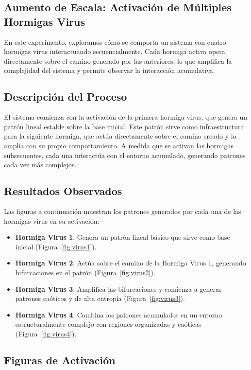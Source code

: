 \documentclass[11pt,letterpaper]{article}
\begin{document}
\begin{multicols}{2}
\section{Aumento de Escala: Activación de Múltiples Hormigas Virus}

En este experimento, exploramos cómo se comporta un sistema con cuatro hormigas virus interactuando secuencialmente. Cada hormiga activa opera directamente sobre el camino generado por las anteriores, lo que amplifica la complejidad del sistema y permite observar la interacción acumulativa.

\subsection{Descripción del Proceso}
El sistema comienza con la activación de la primera hormiga virus, que genera un patrón lineal estable sobre la base inicial. Este patrón sirve como infraestructura para la siguiente hormiga, que actúa directamente sobre el camino creado y lo amplía con su propio comportamiento. A medida que se activan las hormigas subsecuentes, cada una interactúa con el entorno acumulado, generando patrones cada vez más complejos.

\subsection{Resultados Observados}
Las figuras a continuación muestran los patrones generados por cada una de las hormigas virus en su activación:
\begin{itemize}
    \item \textbf{Hormiga Virus 1}: Genera un patrón lineal básico que sirve como base inicial (Figura~\ref{fig:virus1}).
    \item \textbf{Hormiga Virus 2}: Actúa sobre el camino de la Hormiga Virus 1, generando bifurcaciones en el patrón (Figura~\ref{fig:virus2}).
    \item \textbf{Hormiga Virus 3}: Amplifica las bifurcaciones y comienza a generar patrones caóticos y de alta entropía (Figura~\ref{fig:virus3}).
    \item \textbf{Hormiga Virus 4}: Combina los patrones acumulados en un entorno estructuralmente complejo con regiones organizadas y caóticas (Figura~\ref{fig:virus4}).
\end{itemize}

\subsection{Figuras de Activación}


\end{multicols}
\end{document}

